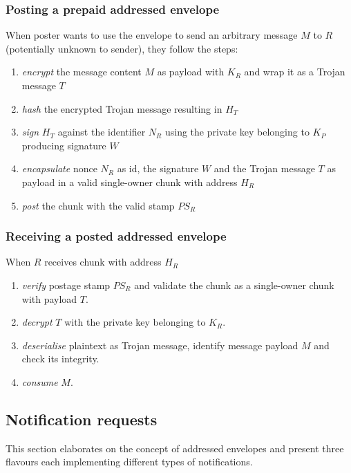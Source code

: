 \subsubsection{Posting a prepaid addressed envelope}

When poster wants to use the envelope to send an arbitrary message $M$ to $R$ (potentially unknown to sender), they 
follow the steps:

\begin{enumerate}
\item \emph{encrypt} the message content $M$ as payload with $K_R$ and wrap it as a Trojan message $T$
\item \emph{hash} the encrypted Trojan message resulting in $H_T$
\item \emph{sign} $H_T$ against the identifier $N_R$ using the private key belonging to $K_P$ producing signature $W$
\item \emph{encapsulate} nonce $N_R$ as id, the signature $W$ and the Trojan message $T$ as payload in a valid single-owner chunk with address $H_R$
\item \emph{post} the chunk with the valid stamp $PS_R$
\end{enumerate}

\subsubsection{Receiving a posted addressed envelope}

When $R$ receives chunk with address $H_R$

\begin{enumerate}
\item \emph{verify} postage stamp $PS_R$ and validate the chunk as a single-owner chunk with payload $T$.
\item \emph{decrypt} $T$ with the private key belonging to $K_R$.
\item \emph{deserialise} plaintext as Trojan message, identify message payload $M$ and check its integrity.
\item \emph{consume} $M$.
\end{enumerate}

\subsection{Notification requests\statusgreen}\label{sec:notification-requests} 


This section elaborates on the concept of addressed envelopes and present three flavours each implementing different types of notifications.

